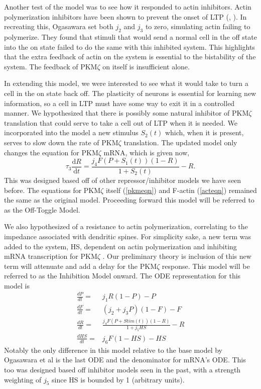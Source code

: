 \documentclass[12pt, a4paper]{article}
\renewcommand{\d}{\textrm{d}}
\newcommand{\PK}{PKM$\zeta$ }
\newcommand{\pk}{\PK}
\newcommand{\citeapa}[1]{(\citeauthor{#1}, \citeyear{#1})}
\newcommand{\derv}[1]{\frac{d#1}{dt}}
\begin{document}
Another test of the model was to see how it responded to actin inhibitors. Actin polymerization inhibitors have been shown to prevent the onset of LTP \citeapa{actin_bois}. In recreating this, Ogasawara set both $j_2$ and $j_3$ to zero, simulating actin failing to polymerize. They found that stimuli that would send a normal cell in the off state into the on state failed to do the same with this inhibited system. This highlights that the extra feedback of actin on the system is essential to the bistability of the system. The feedback of \pk on itself is insufficient alone. 

In extending this model, we were interested to see what it would take to turn a cell in the on state back off. The plasticity of neurons is essential for learning new information, so a cell in LTP must have some way to exit it in a controlled manner. We hypothesized that there is possibly some natural inhibitor of \pk translation that could serve to take a cell out of LTP when it is needed. We incorporated into the model a new stimulus $S_2(t)$ which, when it is present, serves to slow down the rate of \pk translation. The updated model only changes the equation for \pk mRNA, which is given now,
\begin{equation}
    \tau_3\frac{\d R}{\d t} = \frac{j_4F(P+S_1(t))(1-R)}{1 + S_2(t)} -R.
\end{equation}
This was designed based off of other repressor/inhibitor models we have seen before. The equations for \pk itself (\ref{pkmeqn}) and F-actin (\ref{acteqn}) remained the same as the original model. Proceeding forward this model will be referred to as the Off-Toggle Model.

We also hypothesized of a resistance to actin polymerization, correlating to the impedance associated with dendritic spines. For simplicity sake, a new term was added to the system, HS, dependent on actin polymerization and inhibiting mRNA transcription for \PK. Our preliminary theory is inclusion of this new term will attenuate and add a delay for the \PK response. This model will be referred to as the Inhibition Model onward. The ODE representation for this model is 
\begin{align*}
    \derv{P} =& j_1R(1-P)-P\\
    \derv{F} =& (j_2+j_3P)(1-F)-F\\
    \derv{R} =& \frac{j_4F(P + Stim(t))(1-R)}{1+j_5HS} - R\\
    \derv{HS} =& j_6F(1-HS) - HS
\end{align*}
Notably the only difference in this model relative to the base model by Ogasawara et al is the last ODE and the denominator for mRNA's ODE. This too was designed based off inhibitor models seen in the past, with a strength weighting of $j_5$ since HS is bounded by 1 (arbitrary units). 
\end{document}
